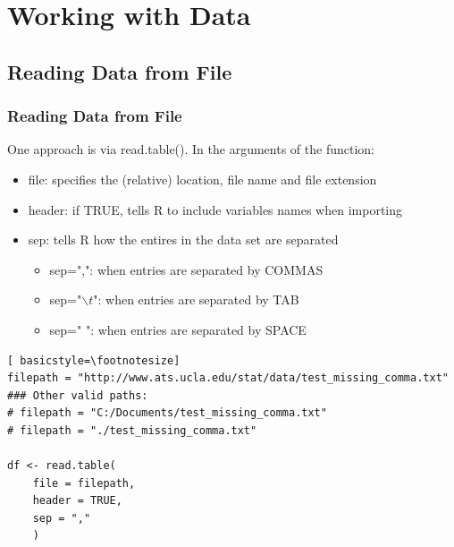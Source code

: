 \section{Working with Data}

\subsection{Reading Data from File}

\begin{frame}
 \frametitle{Reading Data from File}

One approach is via \ttfamily read.table(). \normalfont  In the arguments of the function:
  \begin{itemize}
  \item \ttfamily file: \normalfont specifies the (relative) location, file name and file extension
  \item \ttfamily header: \normalfont if TRUE, tells R to include variables names when importing
  \item \ttfamily sep: \normalfont tells R how the entires in the data set are separated
    \begin{itemize}
      \item \ttfamily sep=",": \normalfont when entries are separated by COMMAS
      \item \ttfamily sep="$\backslash t$":\normalfont \hspace{2.5pt} when entries are separated by TAB
      \item \ttfamily sep=" ": \normalfont when entries are separated by SPACE
    \end{itemize}
   \end{itemize}

\newpage   
   	\begin{lstlisting}[ basicstyle=\footnotesize]
filepath = "http://www.ats.ucla.edu/stat/data/test_missing_comma.txt"
### Other valid paths:
# filepath = "C:/Documents/test_missing_comma.txt"
# filepath = "./test_missing_comma.txt"

df <- read.table(
	file = filepath, 
	header = TRUE, 
	sep = ","
	)
	\end{lstlisting}
\normalfont
\normalsize
\end{frame}

